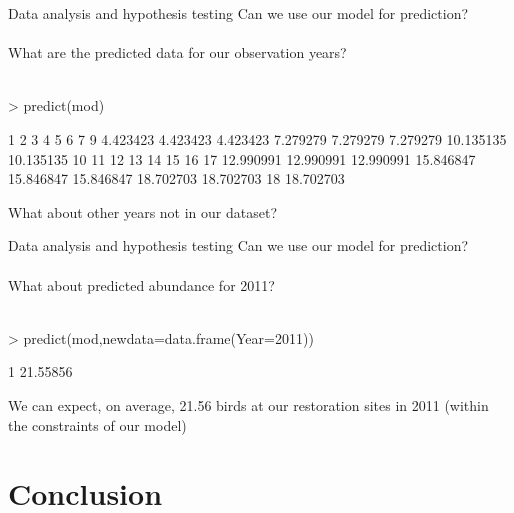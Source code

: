 \documentclass[xcolor=svgnames]{beamer}
\begin{document}
\begin{frame}[fragile]{Data analysis and hypothesis testing}
Can we use our model for prediction?\\~\\
What are the predicted data for our observation years?\\~\\
\begin{Schunk}
\begin{Sinput}
> predict(mod)
\end{Sinput}
\end{Schunk}
\scriptsize
\begin{Schunk}
\begin{Soutput}
        1         2         3         4         5         6         7         9 
 4.423423  4.423423  4.423423  7.279279  7.279279  7.279279 10.135135 10.135135 
       10        11        12        13        14        15        16        17 
12.990991 12.990991 12.990991 15.846847 15.846847 15.846847 18.702703 18.702703 
       18 
18.702703 
\end{Soutput}
\end{Schunk}
\vspace{0.2in}
\normalsize
What about other years not in our dataset?
\end{frame}

\begin{frame}[fragile]{Data analysis and hypothesis testing}
Can we use our model for prediction?\\~\\
What about predicted abundance for 2011?\\~\\
\begin{Schunk}
\begin{Sinput}
> predict(mod,newdata=data.frame(Year=2011))
\end{Sinput}
\end{Schunk}
\begin{Schunk}
\begin{Soutput}
       1 
21.55856 
\end{Soutput}
\end{Schunk}
\vspace{0.2in}
We can expect, on average, 21.56 birds at our restoration sites in 2011 (within the constraints of our model)
\end{frame}

\section{Conclusion}
\end{document}
